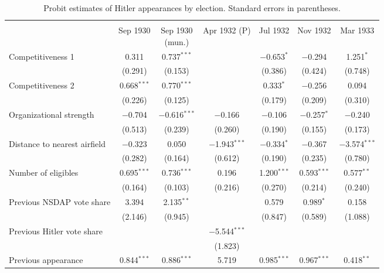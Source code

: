
\begin{table}[t!] \centering 
  \caption{Probit estimates of Hitler appearances by election. Standard errors in parentheses.\label{tab:probit-models}} 
  \label{} 
\footnotesize 
\begin{tabular}{@{\extracolsep{1pt}}lcccccc} 
\\[-1.8ex]\hline 
\hline \\[-1.8ex] 
 & Sep 1930 & \specialcell{Sep 1930 \\(mun.)} & Apr 1932 (P) & Jul 1932 & Nov 1932 & Mar 1933 \\ 
 \cmidrule(r){2-2}\cmidrule(r){3-3}\cmidrule(r){4-4}\cmidrule(r){5-5}\cmidrule(r){6-6}\cmidrule(r){7-7}Competitiveness 1 & 0.311 & 0.737$^{***}$ &  & $-$0.653$^{*}$ & $-$0.294 & 1.251$^{*}$ \\ 
  & (0.291) & (0.153) &  & (0.386) & (0.424) & (0.748) \\ 
  Competitiveness 2 & 0.668$^{***}$ & 0.770$^{***}$ &  & 0.333$^{*}$ & $-$0.256 & 0.094 \\ 
  & (0.226) & (0.125) &  & (0.179) & (0.209) & (0.310) \\ 
  Organizational strength & $-$0.704 & $-$0.616$^{***}$ & $-$0.166 & $-$0.106 & $-$0.257$^{*}$ & $-$0.240 \\ 
  & (0.513) & (0.239) & (0.260) & (0.190) & (0.155) & (0.173) \\ 
  Distance to nearest airfield & $-$0.323 & 0.050 & $-$1.943$^{***}$ & $-$0.334$^{*}$ & $-$0.367 & $-$3.574$^{***}$ \\ 
  & (0.282) & (0.164) & (0.612) & (0.190) & (0.235) & (0.780) \\ 
  Number of eligibles & 0.695$^{***}$ & 0.736$^{***}$ & 0.196 & 1.200$^{***}$ & 0.593$^{***}$ & 0.577$^{**}$ \\ 
  & (0.164) & (0.103) & (0.216) & (0.270) & (0.214) & (0.240) \\ 
  Previous NSDAP vote share & 3.394 & 2.135$^{**}$ &  & 0.579 & 0.989$^{*}$ & 0.158 \\ 
  & (2.146) & (0.945) &  & (0.847) & (0.589) & (1.088) \\ 
  Previous Hitler vote share &  &  & $-$5.544$^{***}$ &  &  &  \\ 
  &  &  & (1.823) &  &  &  \\ 
  Previous appearance & 0.844$^{***}$ & 0.886$^{***}$ & 5.719 & 0.985$^{***}$ & 0.967$^{***}$ & 0.418$^{**}$ \\ 

\end{tabular}
\end{table}
